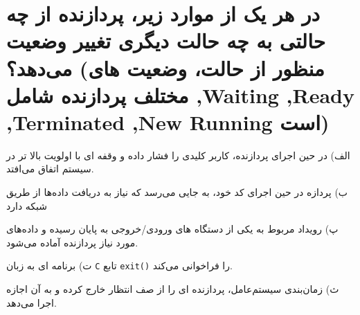 \section{در هر یک از موارد زیر، پردازنده از چه حالتی به چه حالت دیگری تغییر وضعیت می‌دهد؟ (منظور از حالت، وضعیت های مختلف پردازنده شامل ,Waiting ,Ready ,Terminated ,New Running است)}


الف) در حین اجرای پردازنده، کاربر کلیدی را فشار داده و وقفه ای با اولویت بالا تر در سیستم اتفاق می‌افتد.

ب) پردازه در حین اجرای کد خود، به جایی می‌رسد که نیاز به دریافت داده‌ها از طریق شبکه دارد

پ) رویداد مربوط به یکی از دستگاه های ورودی/خروجی به پایان رسیده و داده‌های مورد نیاز پردازنده آماده می‌شود.

ت) برنامه ای به زبان \texttt{C} تابع \texttt{exit()} را فراخوانی می‌کند.

ث) زمان‌بندی سیستم‌عامل، پردازنده ای را از صف انتظار خارج کرده و به آن اجازه اجرا می‌دهد.


